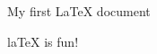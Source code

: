 \documentclass{article}
\begin{document}
    My first LaTeX document
    
    laTeX is fun!
\end{document}
